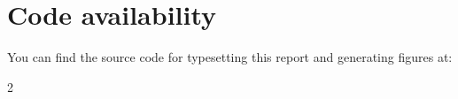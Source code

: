 \documentclass[a4paper, 10pt]{article}
\begin{document}
\section{Code availability}

\begingroup
You can find the source code for typesetting this report and generating figures at:

\endgroup

\begingroup
\renewcommand{\bibfont}{\footnotesize}
\printbibheading
\begin{multicols}{2}
    \printbibliography[heading=none]
\end{multicols}
\end{document}
